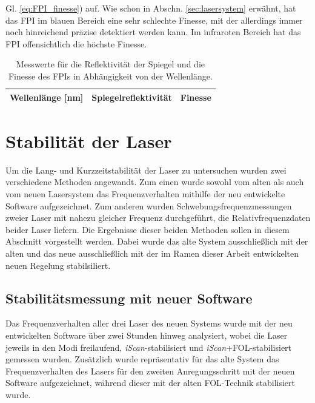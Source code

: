 Gl. \eqref{eq:FPI_finesse}) auf. Wie schon in Abschn. \ref{sec:lasersystem}
erwähnt, hat das FPI im blauen Bereich eine sehr schlechte Finesse, mit der
allerdings immer noch hinreichend präzise detektiert werden kann. Im infraroten Bereich hat das FPI offensichtlich die höchste Finesse.
\begin{table}[h]
	\begin{tabular}{ccc}
		\toprule
		\multicolumn{1}{C{0.30\textwidth}}{Wellenlänge [nm]} &
		\multicolumn{1}{C{0.31\textwidth}}{Spiegelreflektivität} &
		\multicolumn{1}{C{0.30\textwidth}}{Finesse}\\
		\midrule[1px]
		\hline
		
		\bottomrule[1px]
	\end{tabular}
	\caption[FPI Finesse]{Messwerte für die Reflektivität der
	Spiegel und die Finesse des FPIs in Abhängigkeit von der Wellenlänge.}
	\label{tab:finesse}
\end{table}

\section{Stabilität der Laser}\label{sec:stabilitaet_der_laser}
Um die Lang- und Kurzzeitstabilität der Laser zu untersuchen wurden zwei
verschiedene Methoden angewandt. Zum einen wurde sowohl vom alten als auch vom
neuen Lasersystem das Frequenzverhalten mithilfe der neu entwickelte Software
aufgezeichnet. Zum anderen wurden Schwebungsfrequenzmessungen zweier Laser mit
nahezu gleicher Frequenz durchgeführt, die Relativfrequenzdaten beider Laser
liefern. Die Ergebnisse dieser beiden Methoden sollen in diesem Abschnitt
vorgestellt werden. Dabei wurde das alte System ausschließlich mit der alten und
das neue ausschließlich mit der im Ramen dieser Arbeit entwickelten
neuen Regelung stabilsiliert.

\subsection{Stabilitätsmessung mit neuer
Software}\label{sec:stabilitaetsmessungen_software} Das Frequenzverhalten
aller drei Laser des neuen Systems wurde mit der neu entwickelten Software über zwei Stunden hinweg analysiert, wobei die
Laser jeweils in den Modi freilaufend, \textit{iScan}-stabilisiert und
\textit{iScan}+FOL-stabilisiert gemessen wurden. Zusätzlich wurde repräsentativ
für das alte System das Frequenzverhalten des Lasers für den zweiten
Anregungsschritt mit der neuen Software aufgezeichnet, während dieser
mit der alten FOL-Technik stabilisiert wurde.

